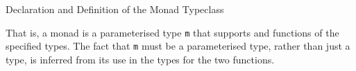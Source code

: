 \begin{listing}[h!tbp]
\caption{Declaration and Definition of the Monad Typeclass}
\label{lst:Monad_Declaration_Definition}
\end{listing}

That is, a monad is a parameterised type \texttt{m} that supports  and \haskellinline{>>=} functions of the specified types.
The fact that \texttt{m} must be a parameterised type, rather than just a type, is inferred from its use in the types for the two functions.

